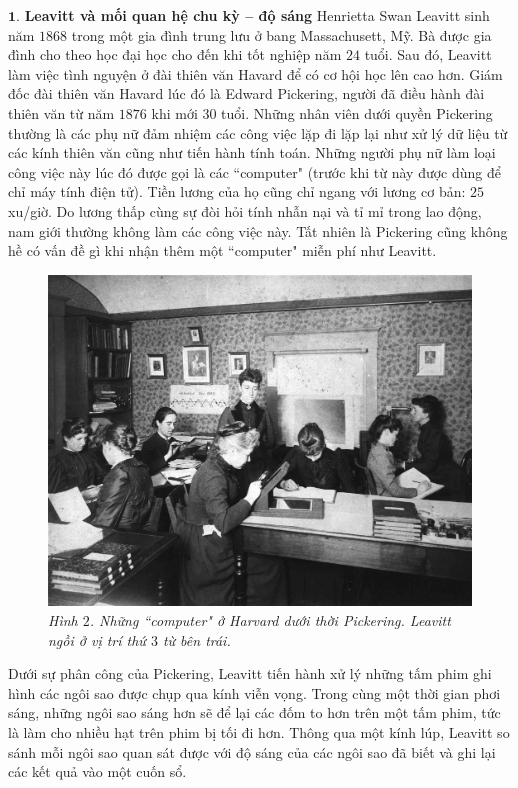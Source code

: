 \begin{multicols}{2}
	$\pmb{1.}$ \textbf{\color{timhieukhoahoc}Leavitt và mối quan hệ chu kỳ -- độ sáng}
	\vskip 0.1cm
	Henrietta Swan Leavitt sinh năm $1868$ trong một gia đình trung lưu ở bang Massachusett, Mỹ. Bà được gia đình cho theo học đại học cho đến khi tốt nghiệp năm $24$ tuổi. Sau đó, Leavitt làm việc tình nguyện ở đài thiên văn Havard để có cơ hội học lên cao hơn.
	\vskip 0.1cm
	Giám đốc đài thiên văn Havard lúc đó là Edward Pickering, người đã điều hành đài thiên văn từ năm $1876$ khi mới $30$ tuổi. Những nhân viên dưới quyền Pickering thường là các phụ nữ đảm nhiệm các công việc lặp đi lặp lại như xử lý dữ liệu từ các kính thiên văn cũng như tiến hành tính toán. Những người phụ nữ làm loại công việc này lúc đó được gọi là các ``computer" (trước khi từ này được dùng để chỉ máy tính điện tử). Tiền lương của họ cũng chỉ ngang với lương cơ bản: $25$ xu/giờ. Do lương thấp cùng sự đòi hỏi tính nhẫn nại và tỉ mỉ trong lao động, nam giới thường không làm các công việc này. Tất nhiên là Pickering cũng không hề có vấn đề gì khi nhận thêm một ``computer" miễn phí như Leavitt. 
	\begin{figure}[H]
		\vspace*{-5pt}
		\centering
		\captionsetup{labelformat= empty, justification=centering}
		\includegraphics[width= 1\linewidth]{2}
		\caption{\small\textit{\color{timhieukhoahoc}Hình $2$. Những ``computer" ở Harvard dưới thời Pickering. Leavitt ngồi ở vị trí  thứ $3$ từ bên trái.}}
		\vspace*{-10pt}
	\end{figure}
	Dưới sự phân công của Pickering, Leavitt tiến hành xử lý những tấm phim ghi hình các ngôi sao được chụp qua kính viễn vọng. Trong cùng một thời gian phơi sáng, những ngôi sao sáng hơn sẽ để lại các đốm to hơn trên một tấm phim, tức là làm cho nhiều hạt trên phim bị tối đi hơn. Thông qua một kính lúp, Leavitt so sánh mỗi ngôi sao quan sát được với độ sáng của các ngôi sao đã biết và ghi lại các kết quả vào một cuốn sổ.

\end{multicols}
